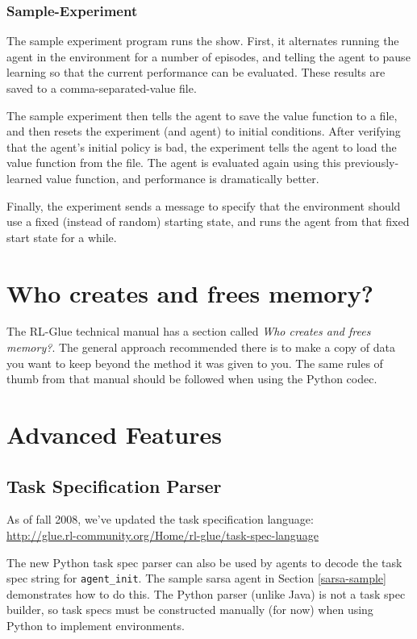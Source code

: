 \documentclass[11pt]{article}
\begin{document}
\subsubsection{Sample-Experiment}
The sample experiment program runs the show.  First, it alternates running the agent in the environment for a number of episodes, and telling the agent to pause learning so that the current performance can be evaluated.  These results are saved to a comma-separated-value file.

The sample experiment then tells the agent to save the value function to a file, and then resets the experiment (and agent) to initial conditions.  After verifying that the agent's initial policy is bad, the experiment tells the agent to load the value function from the file.  The agent is evaluated again using this previously-learned value function, and performance is dramatically better.

Finally, the experiment sends a message to specify that the environment should use a fixed (instead of random) starting state, and runs the agent from that fixed start state for a while.

\section{Who creates and frees memory?}
The RL-Glue technical manual has a section called \textit{Who creates and frees memory?}.  The general approach recommended there is to make a copy of data
you want to keep beyond the method it was given to you.  The same rules of thumb from that manual should be followed when using the Python codec.


\section{Advanced Features}
\subsection{Task Specification Parser}
As of fall 2008, we've updated the task specification language:\\
\url{http://glue.rl-community.org/Home/rl-glue/task-spec-language}

The new Python task spec parser can also be used by agents to decode the task spec string for \texttt{agent\_init}.  The sample sarsa agent in Section \ref{sarsa-sample} demonstrates how to do this.  The Python parser (unlike Java) is not a task spec builder, so task specs must be constructed manually (for now) when using Python to implement environments.
\end{document}
